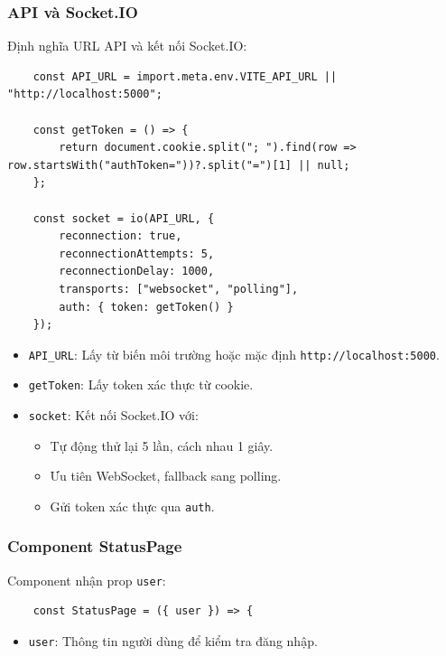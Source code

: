             \subsubsection{API và Socket.IO}
                \hspace*{0.6cm}Định nghĩa URL API và kết nối Socket.IO:
                \begin{lstlisting}
    const API_URL = import.meta.env.VITE_API_URL || "http://localhost:5000";

    const getToken = () => {
        return document.cookie.split("; ").find(row => row.startsWith("authToken="))?.split("=")[1] || null;
    };

    const socket = io(API_URL, {
        reconnection: true,
        reconnectionAttempts: 5,
        reconnectionDelay: 1000,
        transports: ["websocket", "polling"],
        auth: { token: getToken() }
    });
                \end{lstlisting}
                \begin{itemize}
                    \item \texttt{API\_URL}: Lấy từ biến môi trường hoặc mặc định \texttt{http://localhost:5000}.
                    \item \texttt{getToken}: Lấy token xác thực từ cookie.
                    \item \texttt{socket}: Kết nối Socket.IO với:
                    \begin{itemize}
                        \item Tự động thử lại 5 lần, cách nhau 1 giây.
                        \item Ưu tiên WebSocket, fallback sang polling.
                        \item Gửi token xác thực qua \texttt{auth}.
                    \end{itemize}
                \end{itemize}

            \subsubsection{Component StatusPage}
                \hspace*{0.6cm}Component nhận prop \texttt{user}:
                \begin{lstlisting}
    const StatusPage = ({ user }) => {
                \end{lstlisting}
                \begin{itemize}
                    \item \texttt{user}: Thông tin người dùng để kiểm tra đăng nhập.
                \end{itemize}

